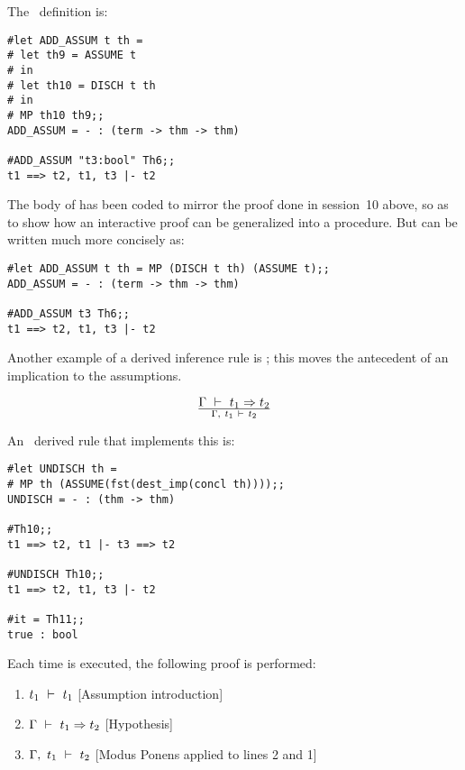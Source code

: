 \noindent The \ML\ definition is:

\begin{session}\begin{verbatim}
#let ADD_ASSUM t th =
# let th9 = ASSUME t
# in
# let th10 = DISCH t th
# in
# MP th10 th9;;
ADD_ASSUM = - : (term -> thm -> thm)

#ADD_ASSUM "t3:bool" Th6;;
t1 ==> t2, t1, t3 |- t2
\end{verbatim}\end{session}

\noindent The body of  has been coded  to mirror  the proof done
in session~10 above, so as to show how an interactive proof  can be generalized
into a  procedure.   But   can be  written much more
concisely as:

\begin{session}\begin{verbatim}
#let ADD_ASSUM t th = MP (DISCH t th) (ASSUME t);;
ADD_ASSUM = - : (term -> thm -> thm)

#ADD_ASSUM t3 Th6;;
t1 ==> t2, t1, t3 |- t2
\end{verbatim}\end{session}


Another example of  a derived  inference rule  is ;  this moves the
antecedent of an implication to the assumptions.

\[ \Gamma\turn t_1\imp t_2 \over\Gamma,\ t_1\turn t_2 \]

\noindent An \ML\ derived rule that implements this is:


\begin{session}\begin{verbatim}
#let UNDISCH th =
# MP th (ASSUME(fst(dest_imp(concl th))));;
UNDISCH = - : (thm -> thm)

#Th10;;
t1 ==> t2, t1 |- t3 ==> t2

#UNDISCH Th10;;
t1 ==> t2, t1, t3 |- t2

#it = Th11;;
true : bool
\end{verbatim}\end{session}

\noindent Each time  is executed,
the following proof is performed:

\begin{enumerate}
\item $t_1\ \vdash\  t_1$ \hfill [Assumption introduction]
\item $\Gamma\ \vdash\  t_1\Rightarrow t_2$ \hfill [Hypothesis]
\item $\Gamma,\ t_1\ \vdash\  t_2$ \hfill [Modus Ponens applied to lines 2 and 1]
\end{enumerate}

